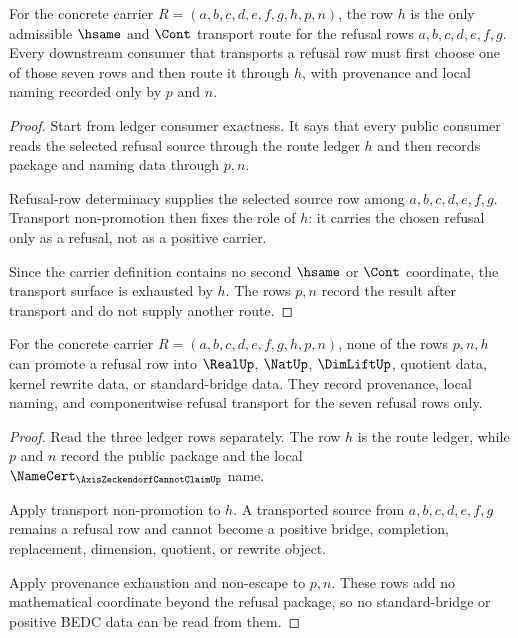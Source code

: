 \begin{theorem}
\label{thm:axis-zeckendorf-cannot-claim-transport-route-exhaustion}
For the concrete carrier $R=(a,b,c,d,e,f,g,h,p,n)$, the row $h$ is the only admissible $\hsame$ and $\Cont$ transport route for the refusal rows $a,b,c,d,e,f,g$. Every downstream consumer that transports a refusal row must first choose one of those seven rows and then route it through $h$, with provenance and local naming recorded only by $p$ and $n$.
\end{theorem}
\begin{proof}
Start from ledger consumer exactness. It says that every public consumer reads the selected refusal source through the route ledger $h$ and then records package and naming data through $p,n$.

Refusal-row determinacy supplies the selected source row among $a,b,c,d,e,f,g$. Transport non-promotion then fixes the role of $h$: it carries the chosen refusal only as a refusal, not as a positive carrier.

Since the carrier definition contains no second $\hsame$ or $\Cont$ coordinate, the transport surface is exhausted by $h$. The rows $p,n$ record the result after transport and do not supply another route.
\end{proof}

\begin{theorem}
\label{thm:axis-zeckendorf-cannot-claim-positive-bridge-exclusion}
For the concrete carrier $R=(a,b,c,d,e,f,g,h,p,n)$, none of the rows $p,n,h$ can promote a refusal row into $\RealUp$, $\NatUp$, $\DimLiftUp$, quotient data, kernel rewrite data, or standard-bridge data. They record provenance, local naming, and componentwise refusal transport for the seven refusal rows only.
\end{theorem}
\begin{proof}
Read the three ledger rows separately. The row $h$ is the route ledger, while $p$ and $n$ record the public package and the local $\NameCert_{\AxisZeckendorfCannotClaimUp}$ name.

Apply transport non-promotion to $h$. A transported source from $a,b,c,d,e,f,g$ remains a refusal row and cannot become a positive bridge, completion, replacement, dimension, quotient, or rewrite object.

Apply provenance exhaustion and non-escape to $p,n$. These rows add no mathematical coordinate beyond the refusal package, so no standard-bridge or positive BEDC data can be read from them.
\end{proof}

